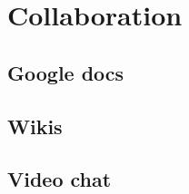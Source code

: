  
\chapter{Collaboration}


\section{Google docs}
\label{sec:google}


\section{Wikis}
\label{sec:wikis}

\section{Video chat}
\label{sec:video}

